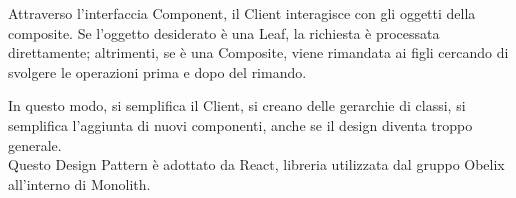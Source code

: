 Attraverso l'interfaccia Component, il Client interagisce con gli
oggetti della composite. Se l'oggetto desiderato è una Leaf, la
richiesta è processata direttamente; altrimenti, se è una Composite,
viene rimandata ai figli cercando di svolgere le operazioni prima e
dopo del rimando. 

In questo modo, si semplifica il Client, si creano delle gerarchie di classi, si semplifica l'aggiunta di nuovi componenti, anche se il design diventa troppo generale. \\
Questo Design Pattern è adottato da React, libreria utilizzata dal gruppo Obelix all'interno di Monolith.
 
























